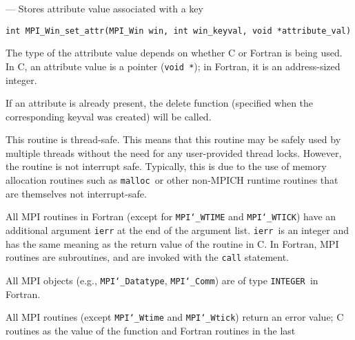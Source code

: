 \startmanpage
{}
--- Stores attribute value associated with a key 
\startvb\begin{verbatim}
int MPI_Win_set_attr(MPI_Win win, int win_keyval, void *attribute_val)

\end{verbatim}
\endvb

\par
{}
\par
The type of the attribute value depends on whether C or Fortran is being used.
In C, an attribute value is a pointer ({\tt void *}); in Fortran, it is an
address-sized integer.
\par
If an attribute is already present, the delete function (specified when the
corresponding keyval was created) will be called.
\par
{}
\par
This routine is thread-safe.  This means that this routine may be
safely used by multiple threads without the need for any user-provided
thread locks.  However, the routine is not interrupt safe.  Typically,
this is due to the use of memory allocation routines such as {\tt malloc
}or other non-MPICH runtime routines that are themselves not interrupt-safe.
\par
{}
All MPI routines in Fortran (except for {\tt MPI{\tt \char`\_}WTIME} and {\tt MPI{\tt \char`\_}WTICK}) have
an additional argument {\tt ierr} at the end of the argument list.  {\tt ierr
}is an integer and has the same meaning as the return value of the routine
in C.  In Fortran, MPI routines are subroutines, and are invoked with the
{\tt call} statement.
\par
All MPI objects (e.g., {\tt MPI{\tt \char`\_}Datatype}, {\tt MPI{\tt \char`\_}Comm}) are of type {\tt INTEGER
}in Fortran.
\par
{}
\par
All MPI routines (except {\tt MPI{\tt \char`\_}Wtime} and {\tt MPI{\tt \char`\_}Wtick}) return an error value;
C routines as the value of the function and Fortran routines in the last
